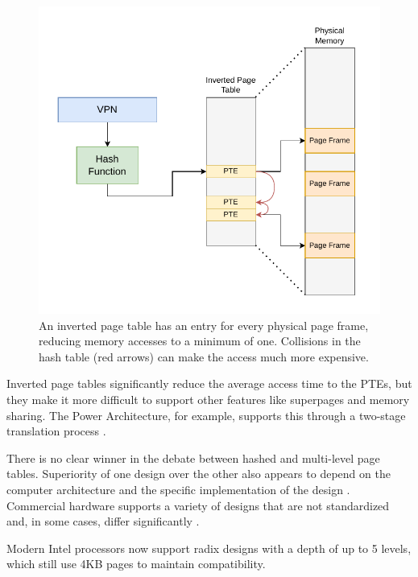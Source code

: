 \begin{figure}[t]
    \centering
    \includegraphics[scale=1]{figures/inverted_pt.pdf}
    \caption[Simple Inverted Page Table Design]{An inverted page table has an entry for every physical
        page frame, reducing memory accesses to a minimum of one. Collisions in the hash table (red arrows) can
        make the access much more expensive. }
    \label{fig:fund:inverted}
\end{figure}


Inverted page tables significantly reduce the average access time to the PTEs, but they make it
more difficult to support other features like superpages and memory sharing.
The Power Architecture, for example, supports this through a two-stage translation process \cite{yaniv2016hash}.


There is no clear winner in the debate between hashed and multi-level page tables.
Superiority of one design over the other also appears to depend on the computer architecture \cite{barrTranslationCachingSkip}
and the specific implementation of the design \cite{yaniv2016hash}.
Commercial hardware supports a variety of designs that are not standardized and, in some cases,
differ significantly \cite{jacob1998look}.

Modern Intel processors now support radix designs with a depth of up to 5 levels,
which still use 4KB pages to maintain compatibility.


